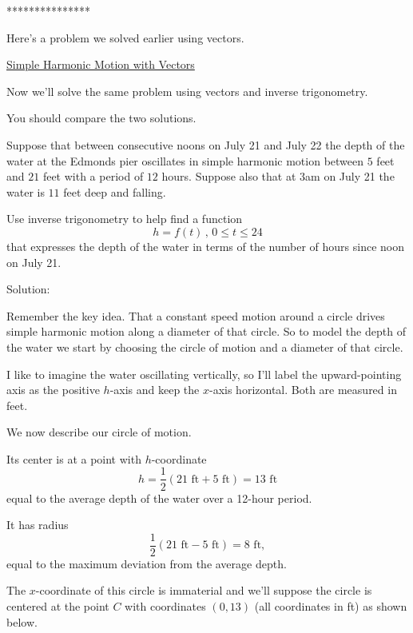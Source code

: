 \documentclass{ximera}
\begin{document}
\iffalse

***************

Here's a problem we solved earlier using vectors. 

\href{https://ximera.osu.edu/precalc2/PreCalculus2/SHMVectors/SHMVectors}{Simple Harmonic Motion with Vectors}

Now we'll solve the same problem using vectors and inverse trigonometry.

You should compare the two solutions.

\begin{question} \label{Qoer333fr}
Suppose that between consecutive noons on July 21 and July 22 the depth of the water at the Edmonds pier oscillates in simple harmonic motion between $5$ feet and $21$ feet with a period of $12$ hours. Suppose also that at 3am on July 21 the water is $11$ feet deep and falling.

Use inverse trigonometry to help find a function
\[
  h = f(t) \, , \, 0\leq t \leq 24
\]
that expresses the depth of the water in terms of the number of hours since noon on July 21.

Solution:

Remember the key idea. That a constant speed motion around a circle drives simple harmonic motion along a diameter of that circle. So to model the depth of the water we start by choosing the circle of motion and a diameter of that circle.

I like to imagine the water oscillating vertically, so I'll label the upward-pointing axis as the positive $h$-axis and keep the $x$-axis horizontal. Both are measured in feet.


We now describe our circle of motion.


Its center is at a point with $h$-coordinate
\[
   h  =  \frac{1}{2}\left( 21 \text{ ft} + 5 \text{ ft} \right) = 13 \text{ ft}
\]
equal to the average depth of the water over a 12-hour period.

It has radius
\[
   \frac{1}{2} \left( 21 \text{ ft} - 5 \text{ ft} \right) = 8\text{ ft} ,
\]
equal to the maximum deviation from the average depth.

The $x$-coordinate of this circle is immaterial and we'll suppose the circle is centered at the point $C$ with coordinates $(0,13)$ (all coordinates in ft) as shown below.



\end{question}
\end{document}
